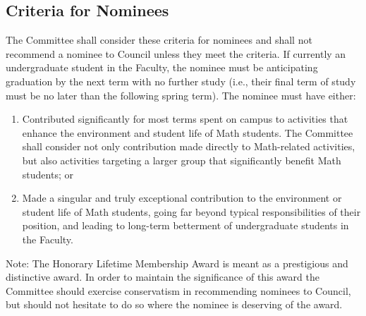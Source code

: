\subsection{Criteria for Nominees}
The Committee shall consider these criteria for nominees and shall not recommend a nominee to Council unless they meet the criteria.
If currently an undergraduate student in the Faculty, the nominee must be anticipating graduation by the next term with no further study (i.e., their final term of study must be no later than the following spring term).
The nominee must have either:
\begin{enumerate}
\item Contributed significantly for most terms spent on campus to activities that enhance the environment and student life of Math students. The Committee shall consider not only contribution made directly to Math-related activities, but also activities targeting a larger group that significantly benefit Math students; or
\item Made a singular and truly exceptional contribution to the environment or student life of Math students, going far beyond typical responsibilities of their position, and leading to long-term betterment of undergraduate students in the Faculty.
\end{enumerate}

Note: The Honorary Lifetime Membership Award is meant as a prestigious and distinctive award. In order to maintain the significance of this award the Committee should exercise conservatism in recommending nominees to Council, but should not hesitate to do so where the nominee is deserving of the award.
